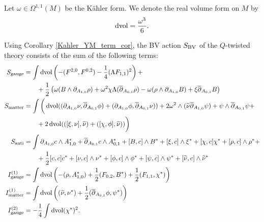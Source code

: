 \documentclass[10pt, oneside]{article}
\newcommand{\gauge}{\mathrm{gauge}}
\newcommand{\matter}{\mathrm{matter}}
\begin{document}
Let $\omega\in\Omega^{1, 1}(M)$ be the K\"ahler form. We denote the real volume form on $M$ by
\[\operatorname{dvol} = \frac{\omega^3}{6}.\]

Using Corollary \ref{Kahler_YM_term_cor}, the BV action $S_{\mathrm{BV}}$ of the $Q$-twisted theory consists of the sum of the following terms:
\begin{align*}
S_{\gauge} &= \int \dvol \left(-(F^{2, 0}, F^{0, 2}) - \frac{1}{4}(\Lambda F_{1, 1})^2\right) + \\
&\qquad + \frac 12 \left( \omega(B \wedge \dd_{A_{1,0}} \rho) + \omega^2\chi\Lambda(\ol \dd_{A_{0,1}} \rho) - \omega(\rho \wedge \dd_{A_{1,0}} B) + \xi \ol \dd_{A_{0,1}} B \right)  \\
S_{\matter} &= \int \bigg( \dvol ((\dd_{A_{1,0}}\nu, \ol \dd_{A_{0,1}} \phi) + (\dd_{A_{1,0}}\phi, \ol \dd_{A_{0,1}} \nu)) + 2\omega^2\wedge(\wt\nu \ol \dd_{A_{1,0}} \psi) + \psi \wedge \ol \dd_{A_{0,1}} \psi + \\
&\qquad + 2\dvol(([\xi,\nu],\wt\nu) + ([\chi, \phi], \wt\nu) )   \bigg) \\
S_{\mr{anti}} &= \int \dd_{A_{1, 0}} c \wedge A_{1, 0}^* + \ol\dd_{A_{0, 1}} c\wedge A_{0, 1}^* + [B, c]\wedge B^* +  [\xi, c]\wedge \xi^* + [\chi, c]\chi^* +[\rho, c]\wedge \rho^* + \\
&\qquad + \frac{1}{2}[c, c]c^* + [\nu, c]\wedge \nu^* + [\phi, c]\wedge \phi^* + [\psi, c]\wedge \psi^* + [\wt\nu, c]\wedge \wt\nu^* \\
I^{(1)}_{\gauge} &=  \int \dvol \left( - (\rho, A_{1,0}^*) + \frac 12 (F_{0,2},B^*) + \frac 12 (F_{1,1}, \chi^*)  \right)\\
I^{(1)}_{\matter} &=  \int \dvol \left( (\wt\nu, \nu^*) + \frac 12( \ol \dd_{A_{0,1}} \phi, \psi^*) \right)\\
I^{(2)}_{\gauge} &= -\frac{1}{4}\int \dvol (\chi^*)^2.
\end{align*}
\end{document}
